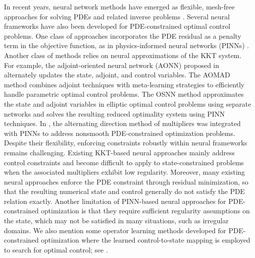 \documentclass{article}
\numberwithin{equation}{section}
\begin{document}
In recent years, neural network methods have emerged as flexible, mesh-free approaches for solving PDEs and related inverse problems \cite{raissi2019physics,yu2018deep,nganyu2023deep,lu2021learning}. Several neural frameworks have also been developed for PDE-constrained optimal control problems. One class of approaches incorporates the PDE residual as a penalty term in the objective function, as in physics-informed neural networks (PINNs) \cite{lu2021physics,mowlavi2023optimal}. Another class of methods relies on neural approximations of the KKT system. For example, the adjoint-oriented neural network (AONN) proposed in \cite{yin2024aonn} alternately updates the state, adjoint, and control variables. The AOMAD method \cite{yong2026adjoint} combines adjoint techniques with meta-learning strategies to efficiently handle parametric optimal control problems. The OSNN method \cite{dai2025solving} approximates the state and adjoint variables in elliptic optimal control problems using separate networks and solves the resulting reduced optimality system using PINN techniques. In \cite{song2024admm}, the alternating direction method of multipliers was integrated with PINNs to address nonsmooth PDE-constrained optimization problems. Despite their flexibility, enforcing constraints robustly within neural frameworks remains challenging. Existing KKT-based neural approaches mainly address control constraints and become difficult to apply to state-constrained problems when the associated multipliers exhibit low regularity. Moreover, many existing neural approaches enforce the PDE constraint through residual minimization, so that the resulting numerical state and control generally do not satisfy the PDE relation exactly. Another limitation of PINN-based neural approaches for PDE-constrained optimization is that they require sufficient regularity assumptions on the state, which may not be satisfied in many situations, such as irregular domains. We also mention some operator learning methods developed for PDE-constrained optimization where the learned control-to-state mapping is employed to search for optimal control; see \cite{hwang2022solving,dong2022optimization}.
\end{document}
